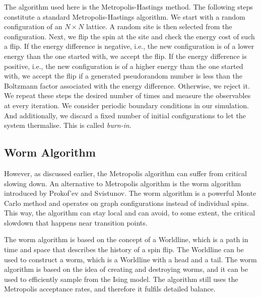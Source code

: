 \documentclass[%
reprint,
 amsmath,amssymb,
 aps,
]{revtex4-2}
\begin{document}
The algorithm used here is the Metropolis-Hastings method. The following steps constitute a standard Metropolis-Hastings algorithm\cite{metro_hastings}. We start with a random configuration of an $N\times N$ lattice. A random site is then selected from the configuration. Next, we flip the spin at the site and check the energy cost of such a flip. If the energy difference is negative, i.e., the new configuration is of a lower energy than the one started with, we accept the flip. If the energy difference is positive, i.e., the new configuration is of a higher energy than the one started with, we accept the flip if a generated pseudorandom number is less than the Boltzmann factor associated with the energy difference. Otherwise, we reject it. We repeat these steps the desired number of times and measure the observables at every iteration. We consider periodic boundary conditions in our simulation. And additionally, we discard a fixed number of initial configurations to let the system thermalise. This is called \textit{burn-in}.

\subsection{Worm Algorithm}
However, as discussed earlier, the Metropolis algorithm can suffer from critical slowing down. An alternative to Metropolis algorithm is the worm algorithm introduced by Prokof'ev and Svistunov\cite{Prokof_ev_2001}. The worm algorithm is a powerful Monte Carlo method and operates on graph configurations instead of individual spins. This way, the algorithm can stay local and can avoid, to some extent, the critical slowdown that happens near transition points.

The worm algorithm is based on the concept of a Worldline, which is a path in time and space that describes the history of a spin flip. The Worldline can be used to construct a worm, which is a Worldline with a head and a tail. The worm algorithm is based on the idea of creating and destroying worms, and it can be used to efficiently sample from the Ising model\cite{Prokof_ev_2001}. The algorithm still uses the Metropolis acceptance rates, and therefore it fulfils detailed balance.
\end{document}
